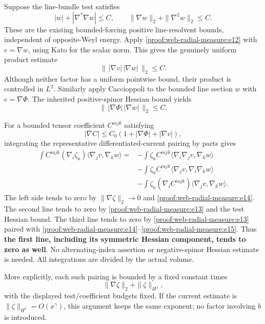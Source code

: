 Suppose the line-bundle test satisfies \[
 |w|+|\nabla^*\nabla w|\le C,
 \qquad \|\nabla w\|_2+\|\nabla^2w\|_2\le C.
\] These are the existing bounded-forcing positive line-resolvent bounds, independent of opposite-Weyl energy. Apply \eqref{proof:web-radial-measure:e12} with \(e=\nabla w\), using Kato for the scalar norm. This gives the genuinely uniform product estimate \[
 \boxed{\|\,|\nabla v|\,|\nabla w|\,\|_2\le C.}
 \tag{\thesection.14}\label{proof:web-radial-measure:e14}
\] Although neither factor has a uniform pointwise bound, their product is controlled in \(L^2\). Similarly apply Caccioppoli to the bounded line section \(w\) with \(e=\nabla\Phi\). The inherited positive-spinor Hessian bound yields \[
 \boxed{\|\,|\nabla\Phi|\,|\nabla w|\,\|_2\le C.}
 \tag{\thesection.15}\label{proof:web-radial-measure:e15}
\]

For a bounded tensor coefficient \(C^{iajk}\) satisfying \[
 |\nabla C|\le C_0(1+|\nabla\Phi|+|\nabla v|),
\] integrating the representative differentiated-current pairing by parts gives \[
 \begin{aligned}
 \int C^{iajk}(\nabla_i\zeta_a)
                  \langle\nabla_jv,\nabla_kw\rangle
 ={}&-\int\zeta_a C^{iajk}
               \langle\nabla_i\nabla_jv,\nabla_kw\rangle\\
 &-\int\zeta_a C^{iajk}
               \langle\nabla_jv,\nabla_i\nabla_kw\rangle\\
 &-\int\zeta_a(\nabla_iC^{iajk})
               \langle\nabla_jv,\nabla_kw\rangle.
 \end{aligned}
 \tag{\thesection.16}\label{proof:web-radial-measure:e16}
\] The left side tends to zero by \(\|\nabla\zeta\|_2\to0\) and \eqref{proof:web-radial-measure:e14}. The second line tends to zero by \eqref{proof:web-radial-measure:e13} and the test Hessian bound. The third line tends to zero by \eqref{proof:web-radial-measure:e13} paired with \eqref{proof:web-radial-measure:e14}–\eqref{proof:web-radial-measure:e15}. Thus \textbf{the first line, including its symmetric Hessian component, tends to zero as well}. No alternating-index assertion or negative-spinor Hessian estimate is needed. All integrations are divided by the actual volume.

More explicitly, each such pairing is bounded by a fixed constant times \[
 \|\nabla\zeta\|_2+\|\zeta\|_{H^1},
\] with the displayed test/coefficient budgets fixed. If the current estimate is \(\|\zeta\|_{H^1}=O(x^\gamma)\), this argument keeps the same exponent; no factor involving \(b\) is introduced.


